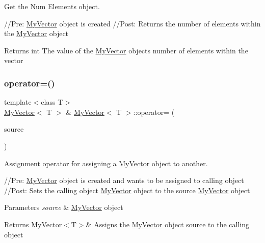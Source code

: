 Get the Num Elements object. 

//\+Pre\+: \mbox{\hyperlink{class_my_vector}{My\+Vector}} object is created //\+Post\+: Returns the number of elements within the \mbox{\hyperlink{class_my_vector}{My\+Vector}} object \begin{DoxyReturn}{Returns}
int The value of the \mbox{\hyperlink{class_my_vector}{My\+Vector}} object\textquotesingle{}s number of elements within the vector 
\end{DoxyReturn}
\mbox{\label{class_my_vector_a459ecae4c3fc3836415467db79bd0af2}} 
\subsubsection{\texorpdfstring{operator=()}{operator=()}}
{\footnotesize\ttfamily template$<$class T$>$ \\
\mbox{\hyperlink{class_my_vector}{My\+Vector}}$<$ T $>$ \& \mbox{\hyperlink{class_my_vector}{My\+Vector}}$<$ T $>$\+::operator= (\begin{DoxyParamCaption}\item[{const \mbox{\hyperlink{class_my_vector}{My\+Vector}}$<$ T $>$ \&}]{source }\end{DoxyParamCaption})}



Assignment operator for assigning a \mbox{\hyperlink{class_my_vector}{My\+Vector}} object to another. 

//\+Pre\+: \mbox{\hyperlink{class_my_vector}{My\+Vector}} object is created and want\textquotesingle{}s to be assigned to calling object //\+Post\+: Sets the calling object \mbox{\hyperlink{class_my_vector}{My\+Vector}} object to the source \mbox{\hyperlink{class_my_vector}{My\+Vector}} object 
\begin{DoxyParams}{Parameters}
{\em source} & \mbox{\hyperlink{class_my_vector}{My\+Vector}} object \\
\hline
\end{DoxyParams}
\begin{DoxyReturn}{Returns}
My\+Vector$<$\+T$>$\& Assigns the \mbox{\hyperlink{class_my_vector}{My\+Vector}} object source to the calling object 
\end{DoxyReturn}
\mbox{\label{class_my_vector_a52eca35ed558d978bf5a8541f9d0115c}} 
